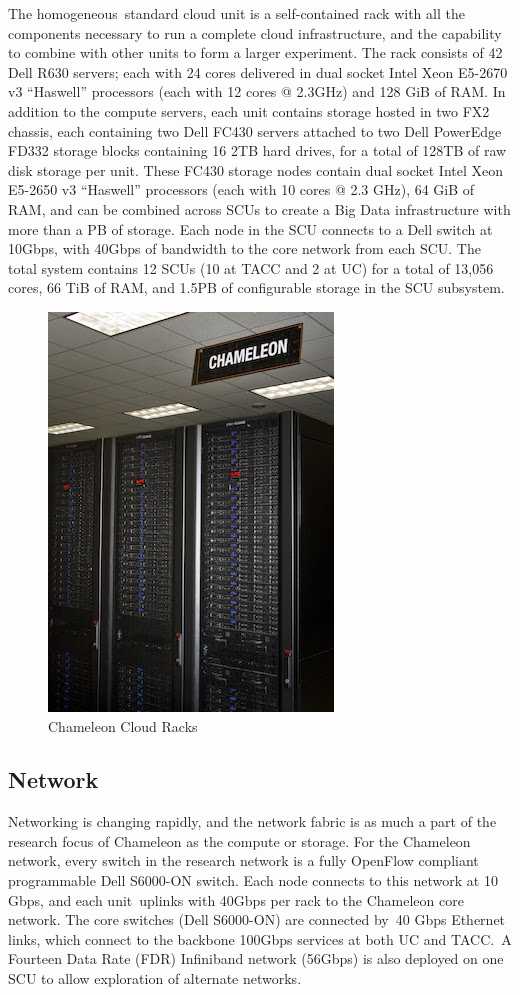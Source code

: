 The homogeneous~standard cloud unit is a self-contained rack with all
the components necessary to run a complete cloud infrastructure, and the
capability to combine with other units to form a larger experiment. The
rack consists of 42 Dell R630 servers; each with 24 cores delivered in
dual socket Intel Xeon E5-2670 v3 ``Haswell'' processors (each with 12
cores @ 2.3GHz) and 128 GiB of RAM. In addition to the compute servers,
each unit contains storage hosted in two FX2 chassis, each containing
two Dell FC430 servers attached to two Dell PowerEdge FD332 storage
blocks containing 16 2TB hard drives, for a total of 128TB of raw disk
storage per unit. These FC430 storage nodes contain dual socket Intel
Xeon E5-2650 v3 ``Haswell'' processors (each with 10 cores @ 2.3 GHz),
64 GiB of RAM, and can be combined across SCUs to create a Big Data
infrastructure with more than a PB of storage. Each node in the SCU
connects to a Dell switch at 10Gbps, with 40Gbps of bandwidth to the
core network from each SCU. The total system contains 12 SCUs (10 at
TACC and 2 at UC) for a total of 13,056 cores, 66 TiB of RAM, and 1.5PB
of configurable storage in the SCU subsystem.

\begin{figure}[htb]
\centering \includegraphics[width=0.5\columnwidth]{images/chameleon/Chameleon2.jpeg}
\caption{Chameleon Cloud Racks}
\end{figure}

\subsection{Network}\label{network}

Networking is changing rapidly, and the network fabric is as much a part
of the research focus of Chameleon as the compute or storage. For the
Chameleon network, every switch in the research network is a fully
OpenFlow compliant programmable Dell S6000-ON switch. Each node connects
to this network at 10 Gbps, and each unit~uplinks with 40Gbps per rack
to the Chameleon core network. The core switches (Dell S6000-ON) are
connected by~40 Gbps Ethernet links, which connect to the backbone
100Gbps services at both UC and TACC.~A Fourteen Data Rate (FDR)
Infiniband network (56Gbps) is also deployed on one SCU to allow
exploration of alternate networks.


